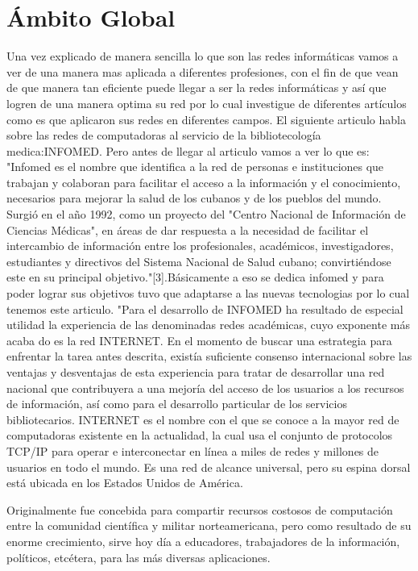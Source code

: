 \documentclass{bmcart}
\begin{document}
\section*{Ámbito Global}
Una vez explicado de manera sencilla lo que son las redes informáticas vamos a ver de una manera mas aplicada a diferentes profesiones, con el fin de que vean de que manera tan eficiente puede llegar a ser la redes informáticas y así que logren de una manera optima su red por lo cual investigue de diferentes artículos como es que aplicaron sus redes en diferentes campos.
El siguiente articulo habla sobre las redes de computadoras al servicio de la bibliotecología medica:INFOMED. Pero antes de llegar al articulo vamos a ver lo que es:
"Infomed es el nombre que identifica a la red de personas e instituciones que trabajan y colaboran para facilitar el acceso a la información y el conocimiento, necesarios para mejorar la salud de los cubanos y de los pueblos del mundo. Surgió en el año 1992, como un proyecto del "Centro Nacional de Información de Ciencias Médicas", en áreas de dar respuesta a la necesidad de facilitar el intercambio de información entre los profesionales, académicos, investigadores, estudiantes y directivos del Sistema Nacional de Salud cubano; convirtiéndose este en su principal objetivo."[3].Básicamente a eso se dedica infomed y para poder lograr sus objetivos tuvo que adaptarse a las nuevas tecnologias por lo cual tenemos este articulo. 
"Para el desarrollo de INFOMED ha resultado de especial utilidad la experiencia de las denominadas redes académicas, cuyo exponente más acaba do es la red INTERNET. En el momento de buscar una estrategia para enfrentar la tarea antes descrita, existía suficiente consenso internacional sobre las ventajas y desventajas de esta experiencia para tratar de desarrollar una red nacional que contribuyera a una mejoría del acceso de los usuarios a los recursos de información, así como para el desarrollo particular de los servicios bibliotecarios.
INTERNET es el nombre con el que se conoce a la mayor red de computadoras existente en la actualidad, la cual usa el conjunto de protocolos TCP/IP para operar e interconectar en línea a miles de redes y millones de usuarios en todo el mundo. Es una red de alcance universal, pero su espina dorsal está ubicada en los Estados Unidos de América.

Originalmente fue concebida para compartir recursos costosos de computación entre la comunidad científica y militar norteamericana, pero como resultado de su enorme crecimiento, sirve hoy día a educadores, trabajadores de la información, políticos, etcétera, para las más diversas aplicaciones.
\end{document}
